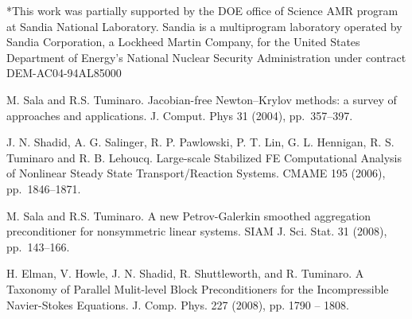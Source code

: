 *This work was partially supported by  the DOE office of Science AMR program at Sandia National Laboratory. Sandia is a multiprogram laboratory operated by Sandia Corporation, a Lockheed Martin Company, for the United States Department of Energy's National Nuclear Security Administration under contract DEM-AC04-94AL85000


\begin{thebibliography}{10}

{\sc M. Sala and R.S. Tuminaro}. {Jacobian-free {N}ewton--{K}rylov methods: a survey of approaches and applications}. J. Comput. Phys 31 (2004), pp.~357--397.

{\sc J. N. Shadid, A. G. Salinger, R. P. Pawlowski, P. T. Lin, G. L. Hennigan, R. S. Tuminaro and R. B. Lehoucq}. {Large-scale Stabilized FE Computational Analysis of Nonlinear Steady State Transport/Reaction Systems}. CMAME 195
  (2006), pp.~1846--1871.

{\sc M. Sala and R.S. Tuminaro}. { A new Petrov-Galerkin smoothed aggregation preconditioner for nonsymmetric linear systems}. SIAM 
J. Sci. Stat. 31 (2008), pp.~143--166.

{\sc H. Elman, V. Howle, J. N.  Shadid, R. Shuttleworth, and R. Tuminaro}.
\newblock A Taxonomy of Parallel Mulit-level Block Preconditioners for the Incompressible Navier-Stokes Equations.
\newblock J. Comp. Phys. 227 (2008), pp. 1790 --  1808. 

\end{thebibliography}
